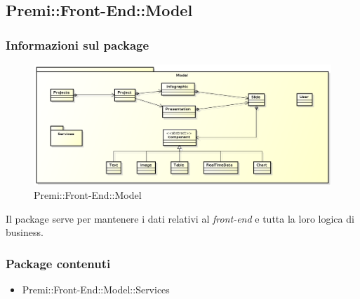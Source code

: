 \subsection{Premi::Front-End::Model}
	\subsubsection{Informazioni sul package}
		\begin{figure}[h]
			\centering
			\includegraphics[width=0.7\linewidth]{img/front-end-package_model}
			\caption[Premi::Front-End::Model]{Premi::Front-End::Model}
		\end{figure}
		Il package serve per mantenere i dati relativi al \textit{front-end} e tutta la loro logica di business.
	\subsubsection{Package contenuti}
		\begin{itemize}
		 \item Premi::Front-End::Model::Services
		\end{itemize}
